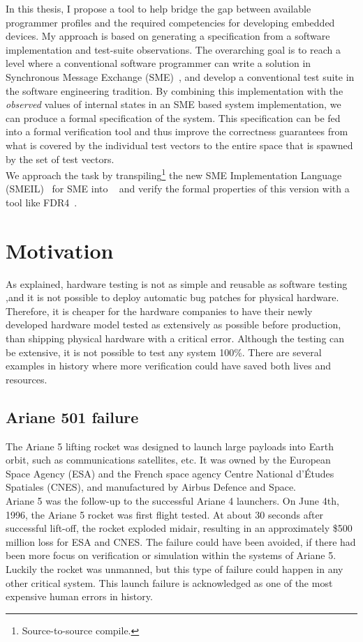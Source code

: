 In this thesis, I propose a tool to help bridge the gap between available programmer profiles and the required competencies for developing embedded devices. My approach is based on generating a specification from a software implementation and test-suite observations. The overarching goal is to reach a level where a conventional software programmer can write a solution in Synchronous Message Exchange (SME)~\cite{Vinter2014, Vinter2015, Skovhede}, and develop a conventional test suite in the software engineering tradition. By combining this implementation with the \emph{observed} values of internal states in an SME based system implementation, we can produce a formal specification of the system. This specification can be fed into a formal verification tool and thus improve the correctness guarantees from what is covered by the individual test vectors to the entire space that is spawned by the set of test vectors.\\

We approach the task by transpiling\footnote{Source-to-source compile.} the new SME Implementation Language (SMEIL)~\cite{smeil} for SME into \cspm{}~\cite{Scattergood1998} and verify the formal properties of this version with a tool like FDR4~\cite{fdr}.
\section{Motivation}
As explained, hardware testing is not as simple and reusable as software testing ,and it is not possible to deploy automatic bug patches for physical hardware. Therefore, it is cheaper for the hardware companies to have their newly developed hardware model tested as extensively as possible before production, than shipping physical hardware with a critical error. Although the testing can be extensive, it is not possible to test any system 100\%. There are several examples in history where more verification could have saved both lives and resources.
\subsection{Ariane 501 failure}
The Ariane 5 lifting rocket\cite{InquiryBoard1996} was designed to launch large payloads into Earth orbit, such as communications satellites, etc. It was owned by the European Space Agency (ESA) and the French space agency Centre National d'\'Etudes Spatiales (CNES), and manufactured by Airbus Defence and Space.\\

Ariane 5 was the follow-up to the successful Ariane 4 launchers. On June 4th, 1996, the Ariane 5 rocket was first flight tested. At about 30 seconds after successful lift-off, the rocket exploded midair, resulting in an approximately \$500 million loss for ESA and CNES. The failure could have been avoided, if there had been more focus on verification or simulation within the systems of Ariane 5. Luckily the rocket was unmanned, but this type of failure could happen in any other critical system. This launch failure is acknowledged as one of the most expensive human errors in history. \\

